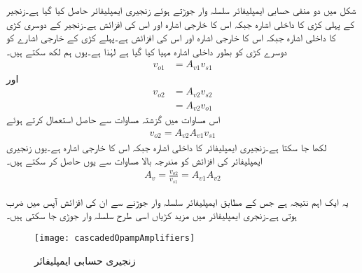 شکل  میں دو منفی حسابی ایمپلیفائر سلسلہ وار جوڑتے ہوئے زنجیری ایمپلیفائر حاصل کیا گیا ہے۔زنجیر کے پہلی کڑی کا داخلی اشارہ  جبکہ اس کا خارجی اشارہ   اور اس کی افزائش  ہے۔زنجیر کے دوسری کڑی کا داخلی اشارہ   جبکہ اس کا خارجی اشارہ   اور اس کی افزائش  ہے۔پہلے کڑی کے خارجی اشارے کو دوسرے کڑی کو بطور داخلی اشارہ مہیا کیا گیا ہے لہٰذا  ہے۔یوں ہم لکھ سکتے ہیں۔
\begin{align*}
v_{o1}&=A_{v1} v_{s1}
\end{align*}
اور
\begin{align*}
v_{o2}&=A_{v2} v_{s2}\\
&=A_{v2} v_{o1}
\end{align*}
اس مساوات میں گزشتہ مساوات سے حاصل  استعمال کرتے ہوئے
\begin{align*}
v_{o2}=A_{v2} A_{v1} v_{s1}
\end{align*}
لکھا جا سکتا ہے۔زنجیری ایمپلیفائر کا داخلی اشارہ  جبکہ اس کا خارجی اشارہ  ہے۔یوں زنجیری ایمپلیفائر کی افزائش  کو مندرجہ بالا مساوات سے یوں حاصل کر سکتے ہیں۔
\begin{align}
A_v=\frac{v_{o2}}{v_{s1}}=A_{v1} A_{v2}
\end{align}

یہ ایک اہم نتیجہ ہے جس کے مطابق ایمپلیفائر سلسلہ وار جوڑنے سے ان کی افزائش آپس میں ضرب ہوتی ہے۔زنجری ایمپلیفائر میں مزید کڑیاں اسی طرح سلسلہ وار جوڑی جا سکتی ہیں۔
\begin{figure}
\centering
\texttt{[image: cascadedOpampAmplifiers]}
\caption{زنجیری حسابی ایمپلیفائر}
\label{شکل_حسابی_زنجیری}
\end{figure}


